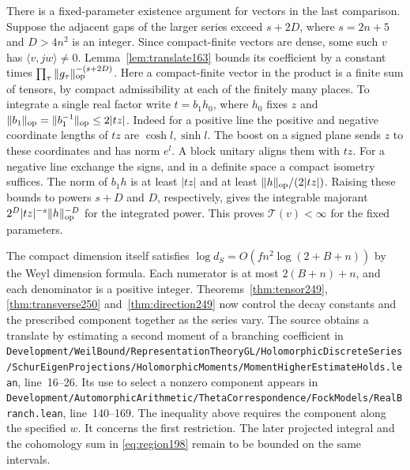 \documentclass[a4paper,11pt]{article}
\theoremstyle{definition}
\theoremstyle{remark}
\newcommand{\srcloc}[2]{{\small\nolinkurl{#1.lean}}, line~#2}
\numberwithin{equation}{section}
\begin{document}
There is a fixed-parameter existence argument for vectors in the
last comparison. Suppose the adjacent gaps of the larger series
exceed \(s+2D\), where \(s=2n+5\) and \(D>4n^2\) is an integer.
Since compact-finite vectors are dense, some such \(v\) has
\(\langle v,jw\rangle\ne0\). Lemma~\ref{lem:translate163} bounds its
coefficient by a constant times \(\prod_\tau\|g_\tau\|_{\rm op}^{-(s+2D)}\).
Here a compact-finite vector in the product is a finite sum of
tensors, by compact admissibility at each of the finitely many
places. To integrate a single real factor write \(t=b_1 h_0\),
where \(h_0\) fixes \(z\) and \(\|b_1\|_{\rm op}=\|b_1^{-1}\|_{\rm op}
\le2|tz|\). Indeed for a positive line the positive and negative
coordinate lengths of \(tz\) are \(\cosh l,\sinh l\). The boost on a
signed plane sends \(z\) to these coordinates and has norm \(e^l\).
A block unitary aligns them with \(tz\). For a negative line exchange
the signs, and in a definite space a compact isometry suffices.
The norm of \(b_1 h\) is at least \(|tz|\) and at least
\(\|h\|_{\rm op}/(2|tz|)\). Raising these bounds to powers \(s+D\)
and \(D\), respectively, gives the integrable majorant
\(2^D|tz|^{-s}\|h\|_{\rm op}^{-D}\) for the integrated power.
This proves \(\mathcal T(v)<\infty\) for the fixed parameters.

The compact dimension itself satisfies
\(\log d_S=O(f n^2\log(2+B+n))\) by the Weyl dimension formula.
Each numerator is at most \(2(B+n)+n\), and each denominator is a
positive integer. Theorems~\ref{thm:tensor249}, \ref{thm:transverse250} and~\ref{thm:direction249} now control the decay constants and the prescribed component together as the series vary. The source obtains a translate by estimating a second moment of a
branching coefficient in
\srcloc{Development/WeilBound/RepresentationTheoryGL/HolomorphicDiscreteSeries/SchurEigenProjections/HolomorphicMoments/MomentHigherEstimateHolds}{16--26}.
Its use to select a nonzero component appears in
\srcloc{Development/AutomorphicArithmetic/ThetaCorrespondence/FockModels/RealBranch}{140--169}.
The inequality above requires the component along the specified \(w\).
It concerns the first restriction. The later projected integral
and the cohomology sum in \eqref{eq:region198} remain to be bounded
on the same intervals.
\end{document}

